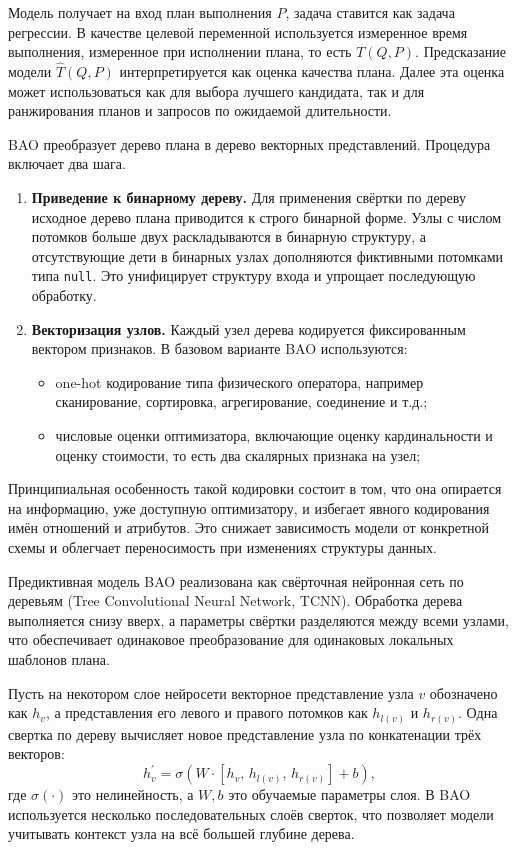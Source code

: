 Модель получает на вход план выполнения \(P\), задача ставится как задача регрессии. В качестве целевой переменной используется измеренное время выполнения, измеренное при исполнении плана, то есть \(T(Q,P)\). Предсказание модели \(\widehat{T}(Q,P)\) интерпретируется как оценка качества плана. Далее эта оценка может использоваться как для выбора лучшего кандидата, так и для ранжирования планов и запросов по ожидаемой длительности.

BAO преобразует дерево плана в дерево векторных представлений. Процедура включает два шага.

\begin{enumerate}
    \item \textbf{Приведение к бинарному дереву.}
    Для применения свёртки по дереву исходное дерево плана приводится к строго бинарной форме. Узлы с числом потомков больше двух раскладываются в бинарную структуру, а отсутствующие дети в бинарных узлах дополняются фиктивными потомками типа \texttt{null}. Это унифицирует структуру входа и упрощает последующую обработку.

    \item \textbf{Векторизация узлов.}
    Каждый узел дерева кодируется фиксированным вектором признаков. В базовом варианте BAO используются:
    \begin{itemize}
        \item one-hot кодирование типа физического оператора, например сканирование, сортировка, агрегирование, соединение и т.д.;
        \item числовые оценки оптимизатора, включающие оценку кардинальности и оценку стоимости, то есть два скалярных признака на узел;
    \end{itemize}
 
\end{enumerate}

Принципиальная особенность такой кодировки состоит в том, что она опирается на информацию, уже доступную оптимизатору, и избегает явного кодирования имён отношений и атрибутов. Это снижает зависимость модели от конкретной схемы и облегчает переносимость при изменениях структуры данных.

Предиктивная модель BAO реализована как свёрточная нейронная сеть по деревьям (Tree Convolutional Neural Network, TCNN). Обработка дерева выполняется снизу вверх, а параметры свёртки разделяются между всеми узлами, что обеспечивает одинаковое преобразование для одинаковых локальных шаблонов плана.

Пусть на некотором слое нейросети векторное представление узла \(v\) обозначено как \(h_v\), а представления его левого и правого потомков как \(h_{l(v)}\) и \(h_{r(v)}\). Одна свертка по дереву вычисляет новое представление узла по конкатенации трёх векторов:
\begin{equation}
h^{\prime}_v = \sigma\left(W \cdot [h_v,\, h_{l(v)},\, h_{r(v)}] + b\right),
\end{equation}
где \(\sigma(\cdot)\) это нелинейность, а \(W,b\) это обучаемые параметры слоя. В BAO используется несколько последовательных слоёв сверток, что позволяет модели учитывать контекст узла на всё большей глубине дерева.


